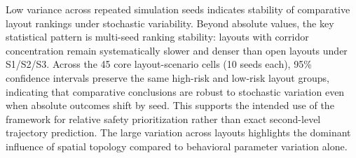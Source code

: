 \documentclass[utf8]{FrontiersinHarvard}
\begin{document}
Low variance across repeated simulation seeds indicates stability of comparative layout rankings under stochastic variability.
Beyond absolute values, the key statistical pattern is multi-seed ranking stability: layouts with corridor concentration remain systematically slower and denser than open layouts under S1/S2/S3. Across the 45 core layout-scenario cells (10 seeds each), 95\% confidence intervals preserve the same high-risk and low-risk layout groups, indicating that comparative conclusions are robust to stochastic variation even when absolute outcomes shift by seed. This supports the intended use of the framework for relative safety prioritization rather than exact second-level trajectory prediction.
The large variation across layouts highlights the dominant influence of spatial topology compared to behavioral parameter variation alone.
\end{document}
